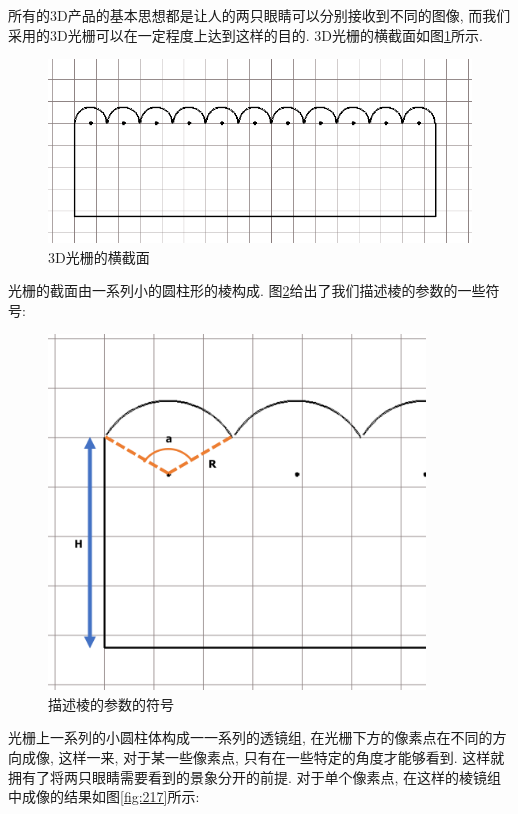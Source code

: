 \documentclass[a4paper, 11pt]{article}
\begin{document}
\begin{CJK}{UTF8}{gbsn}
所有的3D产品的基本思想都是让人的两只眼睛可以分别接收到不同的图像, 而我们采用的3D光栅可以在一定程度上达到这样的目的. 3D光栅的横截面如图\ref{fig:226}所示.
\begin{figure}
  \centerline{\includegraphics[width=\linewidth]{226.png}}
  \caption{3D光栅的横截面}
  \label{fig:226}
\end{figure}
光栅的截面由一系列小的圆柱形的棱构成. 图\ref{fig:227}给出了我们描述棱的参数的一些符号:
\begin{figure}
  \centerline{\includegraphics[width=10cm]{227.png}}
  \caption{描述棱的参数的符号}
  \label{fig:227}
\end{figure}
光栅上一系列的小圆柱体构成一一系列的透镜组, 在光栅下方的像素点在不同的方向成像, 这样一来, 对于某一些像素点, 只有在一些特定的角度才能够看到. 这样就拥有了将两只眼睛需要看到的景象分开的前提. 对于单个像素点, 在这样的棱镜组中成像的结果如图\ref{fig:217}所示:
\begin{figure}

\end{figure}
\end{CJK}
\end{document}

